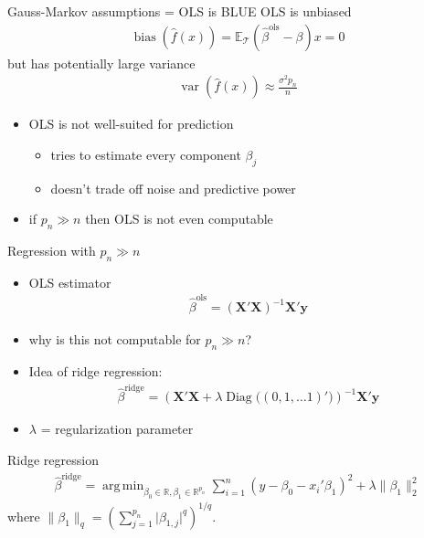 \documentclass[xcolor=dvipsnames]{beamer}
\newcommand{\E}{\mathbb{E}}
\DeclareMathOperator{\bias}{bias}
\DeclareMathOperator{\var}{var}
\DeclareMathOperator{\diag}{Diag}
\DeclareMathOperator{\argmin}{arg\,min}
\begin{document}
\begin{frame}{Gauss-Markov assumptions = OLS is BLUE}
OLS is unbiased 
\begin{align*}
  \bias \left(\hat{f}(x) \right) = \E_{\mathcal{T}} \left(\hat{\beta}^{\text{ols}} - \beta \right) x = 0
\end{align*}
but has potentially large variance
\begin{align*}
  \var \left(\hat{f} (x) \right) \approx \frac{\sigma^2 p_n}{n}
\end{align*}
\begin{itemize}
  \item OLS is not well-suited for prediction
  \begin{itemize}
    \item
    tries to estimate every component $\beta_j$
    \item 
    doesn't trade off noise and predictive power
  \end{itemize}
  \item if $p_n \gg n$ then OLS is not even computable
\end{itemize}
\end{frame}


\begin{frame}{Regression with $p_n \gg n$}
\begin{itemize}
  \item OLS estimator
  \begin{align*}
    \hat{\beta}^{\text{ols}} = \left(\mathbf{X}'\mathbf{X}\right)^{-1} \mathbf{X}' \mathbf{y}
  \end{align*}
  \item why is this not computable for $p_n \gg n$?
  \pause
  \item Idea of ridge regression:
  \begin{align*}
    \hat{\beta}^{\text{ridge}} = \left(\mathbf{X}'\mathbf{X} + \lambda \diag\big((0, 1, \dotsc 1)'\big) \right)^{-1} \mathbf{X}' \mathbf{y}
  \end{align*}
  \item $\lambda$ = regularization parameter
\end{itemize}
\end{frame}


\begin{frame}{Ridge regression}
\begin{align*}
  \hat{\beta}^{\text{ridge}} = \argmin_{\beta_0 \in \mathbb{R}, \beta_1 \in \mathbb{R}^{p_n}} \sum_{i=1}^n \left(y - \beta_0 - x_i'\beta_1\right)^2 + \lambda \lVert \beta_1 \rVert_2^2 
\end{align*}
where $\lVert \beta_1 \rVert_q = \left(\sum_{j=1}^{p_n} \lvert \beta_{1, j} \rvert^q \right)^{1/q}$.
\end{frame}
\end{document}
